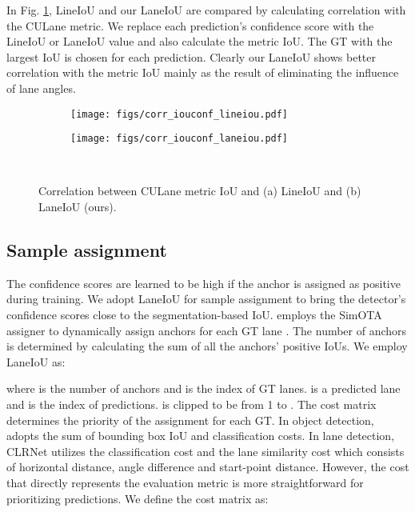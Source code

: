 \documentclass[10pt,twocolumn,letterpaper]{article}
\begin{document}
In Fig. \ref{fig:correlation}, LineIoU \cite{Zheng_2022_CVPR} and our LaneIoU are compared by calculating correlation with the CULane metric.
We replace each prediction's confidence score with the LineIoU or LaneIoU value and also calculate the metric IoU. The GT with the largest IoU is chosen for each prediction.
Clearly our LaneIoU shows better correlation with the metric IoU mainly as the result of eliminating the influence of lane angles.


\begin{figure}[htb]
\centering
  \begin{subfigure}[b]{.495\linewidth}
    \centering
    \texttt{[image: figs/corr\_iouconf\_lineiou.pdf]}
    \caption{}
  \end{subfigure}
  \begin{subfigure}[b]{.495\linewidth}
    \centering
    \texttt{[image: figs/corr\_iouconf\_laneiou.pdf]}
    \caption{}
  \end{subfigure}\\\caption{Correlation between CULane metric IoU and (a) LineIoU \cite{Zheng_2022_CVPR} and (b) LaneIoU (ours).}
\label{fig:correlation}
\end{figure}


\subsection{Sample assignment}
The confidence scores are learned to be high if the anchor is assigned as positive during training. We adopt LaneIoU for sample assignment to bring the detector's confidence scores close to the segmentation-based IoU.
\cite{Zheng_2022_CVPR} employs the SimOTA assigner \cite{YOLOX} to dynamically assign  anchors for each GT lane . The number of anchors  is determined by calculating the sum of all the anchors' positive IoUs. We employ LaneIoU as:

where  is the number of anchors and  is the index of  GT lanes.  is a predicted lane and  is the index of  predictions.
 is clipped to be from 1 to .
The cost matrix determines the priority of the assignment for each GT.
In object detection, \cite{YOLOX} adopts the sum of bounding box IoU and classification costs.
In lane detection, CLRNet \cite{Zheng_2022_CVPR} utilizes the classification cost and the lane similarity cost which consists of horizontal distance, angle difference and start-point distance.
However, the cost that directly represents the evaluation metric is more straightforward for prioritizing predictions.
We define the cost matrix as:
\end{document}
